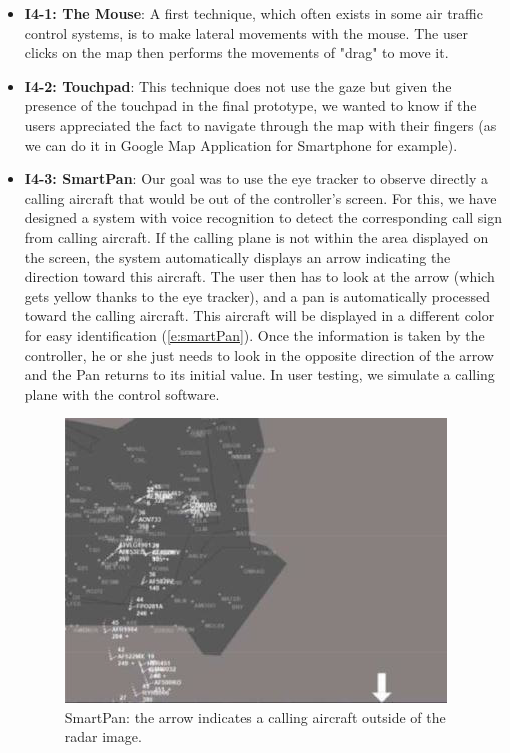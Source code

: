 \begin{itemize}

\item \textbf{I4-1: The Mouse}: A first technique, which often exists in some air traffic control systems, is to make lateral movements with the mouse. The user clicks on the map then performs the
movements of "drag" to move it.

\item \textbf{I4-2: Touchpad}: This technique does not use the gaze but given the presence of the touchpad in the final prototype, we wanted to know if the users appreciated the fact to navigate through the map
with their fingers (as we can do it in Google Map
Application for Smartphone for example).

\item \textbf{I4-3: SmartPan}: Our goal was to use the eye tracker to observe directly a calling aircraft that would be out of the controller's screen.
For this, we have designed a system with voice recognition
to detect the corresponding call sign from calling aircraft. If
the calling plane is not within the area displayed on the
screen, the system automatically displays an arrow
indicating the direction toward this aircraft. The user then
has to look at the arrow (which gets yellow thanks to the eye
tracker), and a pan is automatically processed toward the
calling aircraft. This aircraft will be displayed in a different
color for easy identification (\autoref{e:smartPan}). Once the information
is taken by the controller, he or she just needs to look in the
opposite direction of the arrow and the Pan
returns to its initial value. In user testing, we simulate a calling plane with the control software.
\begin{figure}
 \centering
	\includegraphics{Figures/smartPan.png}
	\caption{
	SmartPan: the arrow indicates a calling
aircraft outside of the radar image.}
	\label{e:smartPan}
\end{figure}


\end{itemize}




